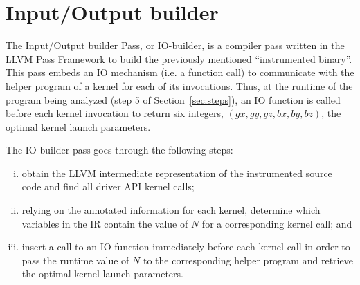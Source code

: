 	


\section{Input/Output builder}
\label{sec:io-builder}
The Input/Output builder Pass, or IO-builder,
is a compiler pass written in the LLVM Pass Framework to
build the previously mentioned ``instrumented binary''.
This pass embeds an IO mechanism (i.e. a function call)
to communicate with the helper program of a kernel for each of its invocations.
Thus, at the runtime of the {\cuda} program being analyzed (step 5 of Section~\ref{sec:steps}),
an IO function is called before each kernel invocation to return six integers,
$(gx, gy, gz, bx, by, bz)$, the optimal kernel launch parameters.

The IO-builder pass goes through the following steps:
\begin{enumerate}[(i)]
\item obtain the LLVM intermediate representation
of the instrumented source code and find all {\cuda} driver API kernel calls;
\item relying on the annotated information for each kernel,
determine which variables in the IR contain the value of $N$ for a 
corresponding kernel call; and
\item insert a call to an IO function immediately before each kernel call
in order to pass the runtime value of $N$ to the
corresponding helper program and retrieve the optimal kernel
launch parameters.
\end{enumerate}
 
